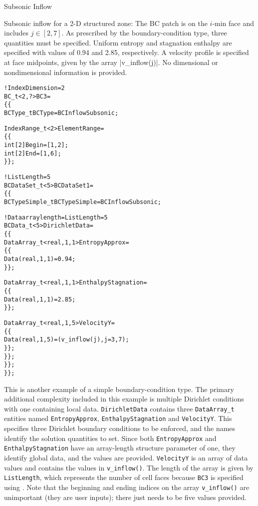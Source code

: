 \begin{example}{Subsonic Inflow}
\label{ex:bc3}

Subsonic inflow for a 2-D structured zone: The BC patch is on the
$i$-min face and  includes $j \in [2, 7]$.
As prescribed by the boundary-condition type, three quantities must be
specified.  Uniform entropy and stagnation enthalpy are specified with
values of 0.94 and 2.85, respectively.  A velocity profile is specified
at face midpoints, given by the array |v_inflow(j)|.  No dimensional or
nondimensional information is provided.
\begin{alltt}
  !  IndexDimension = 2
  BC\_t<2,?> BC3 =
    \{\{
    BCType\_t BCType = BCInflowSubsonic ;

    IndexRange\_t<2> ElementRange = 
      \{\{ 
      int[2] Begin = [1,2] ;
      int[2] End   = [1,6] ;
      \}\} ;

    !  ListLength = 5
    BCDataSet\_t<5> BCDataSet1 =
      \{\{
      BCTypeSimple\_t BCTypeSimple = BCInflowSubsonic ;

      !  Data array length = ListLength = 5
      BCData\_t<5> DirichletData =
        \{\{
        DataArray\_t<real, 1, 1> EntropyApprox = 
          \{\{ 
          Data(real, 1, 1) = 0.94 ;
          \}\} ;

        DataArray\_t<real, 1, 1> EnthalpyStagnation = 
          \{\{ 
          Data(real, 1, 1) = 2.85 ;
          \}\} ;

        DataArray\_t<real, 1, 5> VelocityY =
          \{\{
          Data(real, 1, 5) = (v\_inflow(j), j=3,7) ;
          \}\} ;
        \}\} ;
      \}\} ;
    \}\} ;
\end{alltt}
This is another example of a simple boundary-condition type.
The primary additional complexity included in this example is multiple
Dirichlet conditions with one containing local data.
\texttt{DirichletData} contains three \texttt{DataArray\_t} entities named
\texttt{EntropyApprox}, \texttt{EnthalpyStagnation} and \texttt{VelocityY}.
This specifies three Dirichlet boundary conditions to be enforced, and
the names identify the solution quantities to set.
Since both \texttt{EntropyApprox} and \texttt{EnthalpyStagnation} have an
array-length structure parameter of one, they identify global data, and
the values are provided.
\texttt{VelocityY} is an array of data values and contains the values in
\texttt{v\_inflow()}.
The length of the array is given by \texttt{ListLength}, which represents
the number of cell faces because \texttt{BC3} is specified using
.
Note that the beginning and ending indices on the array
\texttt{v\_inflow()} are unimportant (they are user inputs); there just
needs to be five values provided.
\end{example}

